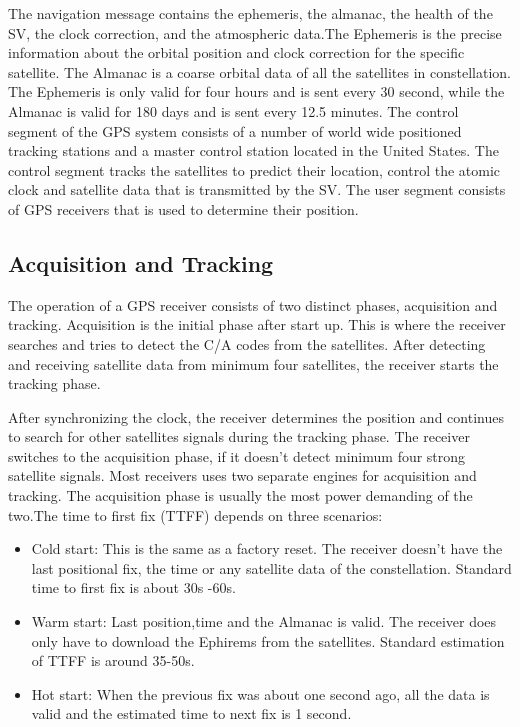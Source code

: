  The navigation message contains the ephemeris, the almanac, the health of the SV, the clock correction, and the atmospheric data.The Ephemeris is the precise information about the orbital position and clock correction for the specific satellite. The Almanac is a coarse orbital data of all the satellites in constellation. The Ephemeris is only valid for four hours and is sent every 30  second, while the Almanac is valid for 180 days and is sent every 12.5 minutes. 
 The control segment of the GPS system consists of a number of world wide positioned tracking stations and a master control station located in the United States. The control segment tracks the satellites to predict their location, control the atomic clock and satellite data that is transmitted by the SV. The user segment consists of GPS receivers that is used to determine their position.
  
  
 \subsection{Acquisition and Tracking}
  
The operation of a GPS receiver consists of two distinct phases, acquisition and tracking. Acquisition is the initial phase after start up. This is where the receiver searches and tries to detect the C/A codes from the satellites. After detecting and receiving satellite data from minimum four satellites, the receiver starts the tracking phase.

After synchronizing the clock, the receiver determines the position and continues to search for other satellites signals during the tracking phase. The receiver switches to the acquisition phase, if it doesn't detect minimum four strong satellite signals.
Most receivers uses two separate engines for acquisition and tracking. The acquisition phase is usually the most power demanding of the two.The time to first fix (TTFF) depends on three scenarios:
\begin{itemize}
\item Cold start: This is the same as a factory reset. The receiver doesn't have the last positional fix, the time or any satellite data of the constellation. Standard time to first fix  is about 30s -60s.
\item Warm start: Last position,time and the Almanac is valid. The receiver does only have to download the Ephirems from the satellites. Standard estimation of TTFF is around 35-50s.
\item Hot start: When the previous fix was about one second ago, all the data is valid and the estimated time to next fix is 1 second. 

\end{itemize}




\newpage